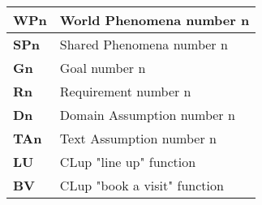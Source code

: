     \begin{center}
        {\renewcommand{\arraystretch}{2}%
        \begin{tabular}{L{2cm}L{12cm}}
            \hline
            \textbf{WPn} & World Phenomena number n \\
            \hline
            \textbf{SPn} & Shared Phenomena number n \\
            \hline
            \textbf{Gn} & Goal number n \\
            \hline
            \textbf{Rn} & Requirement number n \\
            \hline
            \textbf{Dn} & Domain Assumption number n \\
            \hline
            \textbf{TAn} & Text Assumption number n \\
            \hline
            \textbf{LU} & CLup "line up" function \\
            \hline
            \textbf{BV} & CLup "book a visit" function \\
            \hline
        \end{tabular}}
    \end{center}
